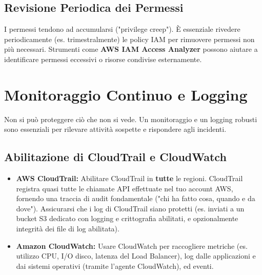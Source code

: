 \documentclass[a4paper,12pt]{report}
\begin{document}
\subsection{Revisione Periodica dei Permessi}
\label{subsec:iam-review}
I permessi tendono ad accumularsi ("privilege creep"). È essenziale rivedere periodicamente (es. trimestralmente) le policy IAM per rimuovere permessi non più necessari. Strumenti come \textbf{AWS IAM Access Analyzer} possono aiutare a identificare permessi eccessivi o risorse condivise esternamente.

\section{Monitoraggio Continuo e Logging}
\label{sec:monitoring-logging}
Non si può proteggere ciò che non si vede. Un monitoraggio e un logging robusti sono essenziali per rilevare attività sospette e rispondere agli incidenti.

\subsection{Abilitazione di CloudTrail e CloudWatch}
\label{subsec:cloudtrail-cloudwatch-enable}
\begin{itemize}
    \item \textbf{AWS CloudTrail:} Abilitare CloudTrail in \textbf{tutte} le regioni. CloudTrail registra quasi tutte le chiamate API effettuate nel tuo account AWS, fornendo una traccia di audit fondamentale ("chi ha fatto cosa, quando e da dove"). Assicurarsi che i log di CloudTrail siano protetti (es. inviati a un bucket S3 dedicato con logging e crittografia abilitati, e opzionalmente integrità dei file di log abilitata).
    \item \textbf{Amazon CloudWatch:} Usare CloudWatch per raccogliere metriche (es. utilizzo CPU, I/O disco, latenza del Load Balancer), log dalle applicazioni e dai sistemi operativi (tramite l'agente CloudWatch), ed eventi.
\end{itemize}
\end{document}
